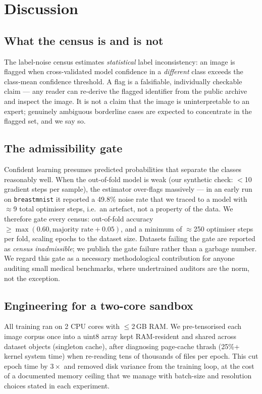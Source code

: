 \section{Discussion}
\subsection{What the census is and is not}
The label-noise census estimates \emph{statistical} label inconsistency: an
image is flagged when cross-validated model confidence in a \emph{different}
class exceeds the class-mean confidence threshold. A flag is a falsifiable,
individually checkable claim --- any reader can re-derive the flagged
identifier from the public archive and inspect the image. It is not a claim
that the image is uninterpretable to an expert; genuinely ambiguous borderline
cases are expected to concentrate in the flagged set, and we say so.
\subsection{The admissibility gate}
Confident learning presumes predicted probabilities that separate the classes
reasonably well. When the out-of-fold model is weak (our synthetic check:
$<$10 gradient steps per sample), the estimator over-flags massively --- in an
early run on \texttt{breastmnist} it reported a 49.8\% noise rate that we
traced to a model with $\approx$9 total optimiser steps, i.e.\ an artefact,
not a property of the data. We therefore gate every census: out-of-fold
accuracy $\geq \max(0.60, \text{majority rate} + 0.05)$, and a minimum of
$\approx$250 optimiser steps per fold, scaling epochs to the dataset size.
Datasets failing the gate are reported as \emph{census inadmissible}; we
publish the gate failure rather than a garbage number. We regard this gate as
a necessary methodological contribution for anyone auditing small medical
benchmarks, where undertrained auditors are the norm, not the exception.
\subsection{Engineering for a two-core sandbox}
All training ran on 2 CPU cores with $\leq$2\,GB RAM. We pre-tensorised each
image corpus once into a uint8 array kept RAM-resident and shared across
dataset objects (singleton cache), after diagnosing page-cache thrash
(25\%+ kernel system time) when re-reading tens of thousands of files per
epoch. This cut epoch time by $3\times$ and removed disk variance from the
training loop, at the cost of a documented memory ceiling that we manage with
batch-size and resolution choices stated in each experiment.
